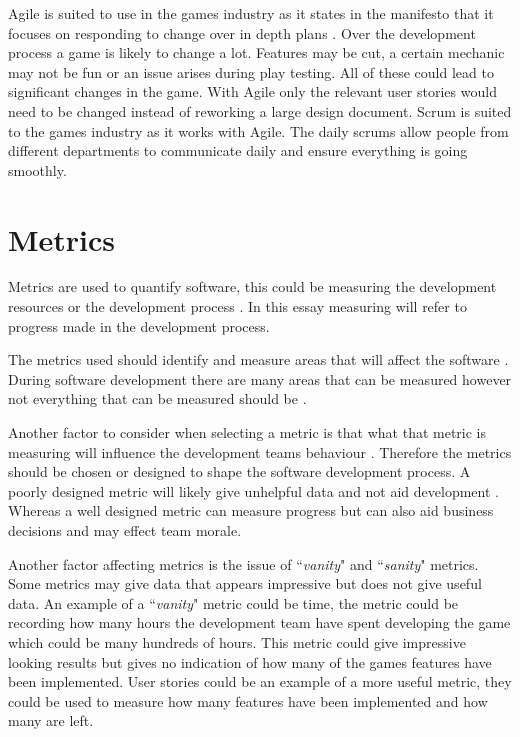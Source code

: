 \documentclass{scrartcl}
\begin{document}
Agile is suited to use in the games industry as it states in the manifesto that it focuses on responding to change over in depth plans \cite{AgileManifesto}.  Over the development process a game is likely to change a lot. Features may be cut, a certain mechanic may not be fun or an issue arises during play testing. All of these could lead to significant changes in the game. With Agile only the relevant user stories would need to be changed instead of reworking a large design document. Scrum is suited to the games industry as it works with Agile. The daily scrums allow people from different departments to communicate daily and ensure everything is going smoothly.


\section{Metrics}

Metrics are used to quantify software, this could be measuring the development resources or the development process \cite{Misra}. In this essay measuring will refer to progress made in the development process. 

The metrics used should identify and measure areas that will affect the software \cite{Misra}. During software development there are many areas that can be measured however not everything that can be measured should be \cite{Hartmann}.

Another factor to consider when selecting a metric is that what that metric is measuring will influence the development teams behaviour \cite{Hartmann}. Therefore the metrics should be chosen or  designed to shape the software development process. A poorly designed metric will likely give unhelpful data and not aid development \cite{Ktata}. Whereas a well designed metric can measure progress but can also aid business decisions and may effect team morale. \cite{Misra}

Another factor affecting metrics is the issue of ``\textit{vanity}" and ``\textit{sanity}" metrics. Some metrics may give data that appears impressive but does not give useful data. An example of a ``\textit{vanity}" metric could be time, the metric could be recording how many hours the development team have spent developing the game which could be many hundreds of hours. This metric could give impressive looking results but gives no indication of how many of the games features have been implemented. User stories could be an example of a more useful metric, they could be used to measure how many features have been implemented and how many are left.
\end{document}
